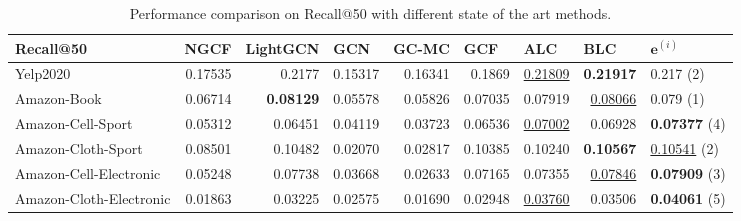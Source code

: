 \begin{table*}[]
    \centering
    \begin{tabular}{|l|r|r|r|r|r||r|r|l|}
        \hline
        Recall@50               & \multicolumn{1}{l|}{NGCF} & \multicolumn{1}{l|}{LightGCN} & \multicolumn{1}{l|}{GCN} & \multicolumn{1}{l|}{GC-MC} & \multicolumn{1}{l||}{GCF} & \multicolumn{1}{l|}{ALC} & \multicolumn{1}{l|}{BLC} & $\mathbf{e}^{(i)}$   \\ \hline
        Yelp2020                & 0.17535                   & 0.2177                        & 0.15317                  & 0.16341                    & 0.1869                    & \underline{0.21809}      & \textbf{0.21917}         & 0.217 (2)   \\ \hline
        Amazon-Book             & 0.06714                   & \textbf{0.08129}              & 0.05578                  & 0.05826                    & 0.07035                   & 0.07919                  & \underline{0.08066}      & 0.079 (1)   \\ \hline
        Amazon-Cell-Sport       & 0.05312                   & 0.06451                       & 0.04119                  & 0.03723                    & 0.06536                   & \underline{0.07002}      & 0.06928                  & \textbf{0.07377} (4) \\ \hline
        Amazon-Cloth-Sport      & 0.08501                   & 0.10482                       & 0.02070                  & 0.02817                    & 0.10385                   & 0.10240                  & \textbf{0.10567}         & \underline{0.10541} (2) \\ \hline
        Amazon-Cell-Electronic  & 0.05248                   & 0.07738                       & 0.03668                  & 0.02633                    & 0.07165                   & 0.07355                  & \underline{0.07846}      & \textbf{0.07909} (3) \\ \hline
        Amazon-Cloth-Electronic & 0.01863                   & 0.03225                       & 0.02575                  & 0.01690                    & 0.02948                   & \underline{0.03760}      & 0.03506                  & \textbf{0.04061} (5) \\ \hline
    \end{tabular}
    \caption{Performance comparison on Recall@50 with different state of the art methods.}
    \label{tab:recallbaselines}
\end{table*}